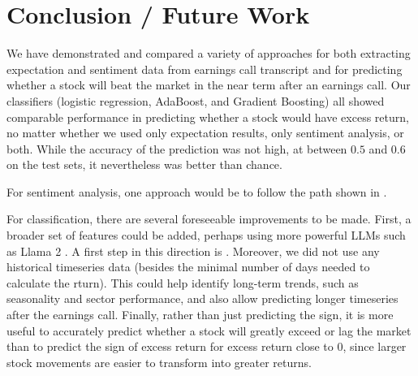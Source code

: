 \documentclass{article}
\newif\ifshowInstructions
\newcommand{\instructions}[1]{%
    \ifshowInstructions%
        \textcolor{violet}{#1}%
    \fi%
}
\begin{document}
\section{Conclusion / Future Work}
We have demonstrated and compared a variety of approaches for both extracting expectation and sentiment data from earnings call transcript and for predicting whether a stock will beat the market in the near term after an earnings call.
Our classifiers (logistic regression, AdaBoost, and Gradient Boosting) all showed comparable performance in predicting whether a stock would have excess return, no matter whether we used only expectation results, only sentiment analysis, or both.
While the accuracy of the prediction was not high, at between $0.5$ and $0.6$ on the test sets, it nevertheless was better than chance.

For sentiment analysis, one approach would be to follow the path shown in \citet{mikolov2013distributed}.

For classification, there are several foreseeable improvements to be made.
First, a broader set of features could be added, perhaps using more powerful LLMs such as Llama 2 \citep{touvron2023llama}.
A first step in this direction is \citet{cook2023evaluating}.
Moreover, we did not use any historical timeseries data (besides the minimal number of days needed to calculate the rturn).
This could help identify long-term trends, such as seasonality and sector performance, and also allow predicting longer timeseries after the earnings call.
Finally, rather than just predicting the sign, it is more useful to accurately predict whether a stock will greatly exceed or lag the market than to predict the sign of excess return for excess return close to 0, since larger stock movements are easier to transform into greater returns.


\end{document}
